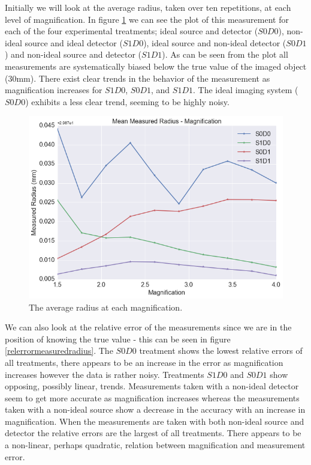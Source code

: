 \documentclass[
  twoside,
  11pt, a4paper,
  footinclude=true,
  headinclude=true,
  cleardoublepage=empty
]{scrbook}
\begin{document}
Initially we will look at the average radius, taken over ten repetitions, at each level of magnification. In figure \ref{avgmeasuredradius} we can see the plot of this measurement for each of the four experimental treatments; ideal source and detector ($S0D0$), non-ideal source and ideal detector ($S1D0$), ideal source and non-ideal detector ($S0D1$) and non-ideal source and detector ($S1D1$). As can be seen from the plot all measurements are systematically biased below the true value of the imaged object (30mm). There exist clear trends in the behavior of the measurement as magnification increases for $S1D0$, $S0D1$, and $S1D1$. The ideal imaging system ($S0D0$) exhibits a less clear trend, seeming to be highly noisy.

\begin{figure}[h!]
  \centering
    \includegraphics[width=\textwidth]{code/RadiusMeasurements/Plots_RadiusCentre_files/Plots_RadiusCentre_4_0.png}
    \caption{The average radius at each magnification.}
    \label{avgmeasuredradius}
\end{figure}

We can also look at the relative error of the measurements since we are in the position of knowing the true value - this can be seen in figure \ref{relerrormeasuredradius}. The $S0D0$ treatment shows the lowest relative errors of all treatments, there appears to be an increase in the error as magnification increases however the data is rather noisy. Treatments $S1D0$ and $S0D1$ show opposing, possibly linear, trends. Measurements taken with a non-ideal detector seem to get more accurate as magnification increases whereas the measurements taken with a non-ideal source show a decrease in the accuracy with an increase in magnification. When the measurements are taken with both non-ideal source and detector the relative errors are the largest of all treatments. There appears to be a non-linear, perhaps quadratic, relation between magnification and measurement error.
\end{document}

